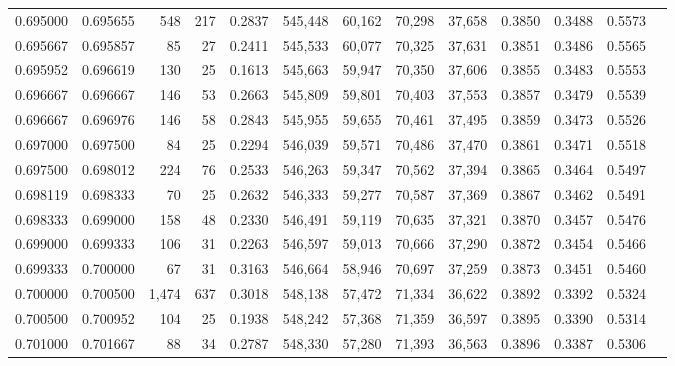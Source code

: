 \begin{tabular}{rrrrrrrrrrrrr}
0.695000 & 0.695655 &   548 & 217 &                                     0.2837 & 545,448 &  60,162 &  70,298 &  37,658 & 0.3850 & 0.3488 & 0.5573 \\
0.695667 & 0.695857 &    85 &  27 &                                     0.2411 & 545,533 &  60,077 &  70,325 &  37,631 & 0.3851 & 0.3486 & 0.5565 \\
0.695952 & 0.696619 &   130 &  25 &                                     0.1613 & 545,663 &  59,947 &  70,350 &  37,606 & 0.3855 & 0.3483 & 0.5553 \\
0.696667 & 0.696667 &   146 &  53 &                                     0.2663 & 545,809 &  59,801 &  70,403 &  37,553 & 0.3857 & 0.3479 & 0.5539 \\
0.696667 & 0.696976 &   146 &  58 &                                     0.2843 & 545,955 &  59,655 &  70,461 &  37,495 & 0.3859 & 0.3473 & 0.5526 \\
0.697000 & 0.697500 &    84 &  25 &                                     0.2294 & 546,039 &  59,571 &  70,486 &  37,470 & 0.3861 & 0.3471 & 0.5518 \\
0.697500 & 0.698012 &   224 &  76 &                                     0.2533 & 546,263 &  59,347 &  70,562 &  37,394 & 0.3865 & 0.3464 & 0.5497 \\
0.698119 & 0.698333 &    70 &  25 &                                     0.2632 & 546,333 &  59,277 &  70,587 &  37,369 & 0.3867 & 0.3462 & 0.5491 \\
0.698333 & 0.699000 &   158 &  48 &                                     0.2330 & 546,491 &  59,119 &  70,635 &  37,321 & 0.3870 & 0.3457 & 0.5476 \\
0.699000 & 0.699333 &   106 &  31 &                                     0.2263 & 546,597 &  59,013 &  70,666 &  37,290 & 0.3872 & 0.3454 & 0.5466 \\
0.699333 & 0.700000 &    67 &  31 &                                     0.3163 & 546,664 &  58,946 &  70,697 &  37,259 & 0.3873 & 0.3451 & 0.5460 \\
0.700000 & 0.700500 & 1,474 & 637 &                                     0.3018 & 548,138 &  57,472 &  71,334 &  36,622 & 0.3892 & 0.3392 & 0.5324 \\
0.700500 & 0.700952 &   104 &  25 &                                     0.1938 & 548,242 &  57,368 &  71,359 &  36,597 & 0.3895 & 0.3390 & 0.5314 \\
0.701000 & 0.701667 &    88 &  34 &                                     0.2787 & 548,330 &  57,280 &  71,393 &  36,563 & 0.3896 & 0.3387 & 0.5306 \\

\end{tabular}
